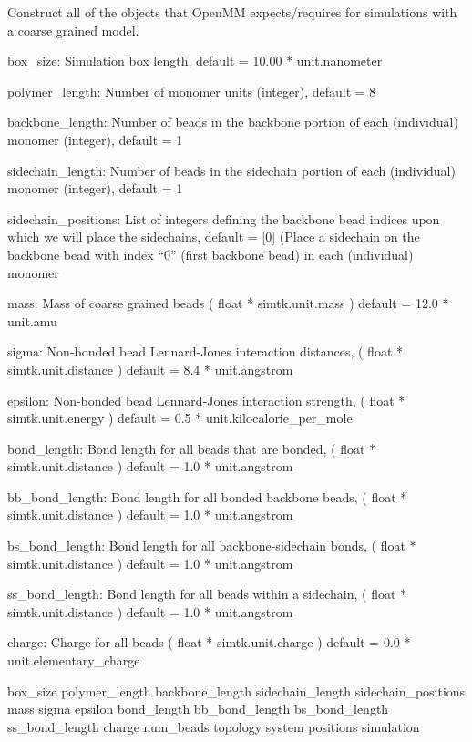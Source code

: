 \documentclass[letterpaper,10pt,english]{sphinxmanual}
\begin{document}
\begin{fulllineitems}
\label{\detokenize{openmm:openmm.cgmodel}}
Construct all of the objects that OpenMM expects/requires 
for simulations with a coarse grained model.

box\_size: Simulation box length, 
default = 10.00 * unit.nanometer

polymer\_length: Number of monomer units (integer), default = 8

backbone\_length: Number of beads in the backbone 
portion of each (individual) monomer (integer), default = 1

sidechain\_length: Number of beads in the sidechain
portion of each (individual) monomer (integer), default = 1

sidechain\_positions: List of integers defining the backbone
bead indices upon which we will place the sidechains,
default = {[}0{]} (Place a sidechain on the backbone bead with
index “0” (first backbone bead) in each (individual) monomer

mass: Mass of coarse grained beads ( float * simtk.unit.mass )
default = 12.0 * unit.amu

sigma: Non-bonded bead Lennard-Jones interaction distances,
( float * simtk.unit.distance )
default = 8.4 * unit.angstrom

epsilon: Non-bonded bead Lennard-Jones interaction strength,
( float * simtk.unit.energy )
default = 0.5 * unit.kilocalorie\_per\_mole

bond\_length: Bond length for all beads that are bonded,
( float * simtk.unit.distance )
default = 1.0 * unit.angstrom

bb\_bond\_length: Bond length for all bonded backbone beads,
( float * simtk.unit.distance )
default = 1.0 * unit.angstrom

bs\_bond\_length: Bond length for all backbone-sidechain bonds,
( float * simtk.unit.distance )
default = 1.0 * unit.angstrom

ss\_bond\_length: Bond length for all beads within a sidechain,
( float * simtk.unit.distance )
default = 1.0 * unit.angstrom

charge: Charge for all beads
( float * simtk.unit.charge )
default = 0.0 * unit.elementary\_charge

box\_size
polymer\_length
backbone\_length
sidechain\_length
sidechain\_positions
mass
sigma
epsilon
bond\_length
bb\_bond\_length
bs\_bond\_length
ss\_bond\_length
charge
num\_beads
topology
system
positions
simulation

\end{fulllineitems}
\end{document}
